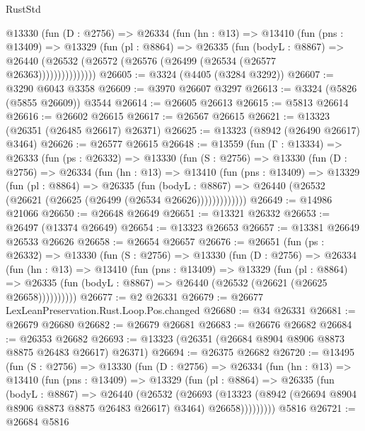 \begin{lexlean}{RustStd}
\begin{coremodule}
          @13330
            (fun (D : @2756) =>
            @26334
              (fun (hn : @13) =>
              @13410
                (fun (pns : @13409) =>
                @13329
                  (fun (pl : @8864) =>
                  @26335
                    (fun (bodyL : @8867) =>
                    @26440 (@26532 (@26572 (@26576 (@26499 (@26534 (@26577 @26363)))))))))))))))
@26605 := @3324 (@4405 (@3284 @3292))
@26607 := @3290 @6043 @3358
@26609 := @3970 @26607 @3297
@26613 := @3324 (@5826 (@5855 @26609)) @3544
@26614 := @26605 @26613
@26615 := @5813 @26614
@26616 := @26602 @26615
@26617 := @26567 @26615
@26621 := @13323 (@26351 (@26485 @26617) @26371)
@26625 := @13323 (@8942 (@26490 @26617) @3464)
@26626 := @26577 @26615
@26648 := @13559
    (fun (Γ : @13334) =>
    @26333
      (fun (ps : @26332) =>
      @13330
        (fun (S : @2756) =>
        @13330
          (fun (D : @2756) =>
          @26334
            (fun (hn : @13) =>
            @13410
              (fun (pns : @13409) =>
              @13329
                (fun (pl : @8864) =>
                @26335
                  (fun (bodyL : @8867) =>
                  @26440 (@26532 (@26621 (@26625 (@26499 (@26534 @26626)))))))))))))
@26649 := @14986 @21066
@26650 := @26648 @26649
@26651 := @13321 @26332
@26653 := @26497 (@13374 @26649)
@26654 := @13323 @26653
@26657 := @13381 @26649 @26533 @26626
@26658 := @26654 @26657
@26676 := @26651
    (fun (ps : @26332) =>
    @13330
      (fun (S : @2756) =>
      @13330
        (fun (D : @2756) =>
        @26334
          (fun (hn : @13) =>
          @13410
            (fun (pns : @13409) =>
            @13329
              (fun (pl : @8864) =>
              @26335 (fun (bodyL : @8867) => @26440 (@26532 (@26621 (@26625 @26658))))))))))
@26677 := @2 @26331
@26679 := @26677 LexLeanPreservation.Rust.Loop.Pos.changed
@26680 := @34 @26331
@26681 := @26679 @26680
@26682 := @26679 @26681
@26683 := @26676 @26682
@26684 := @26353 @26682
@26693 := @13323 (@26351 (@26684 @8904 @8906 @8873 @8875 @26483 @26617) @26371)
@26694 := @26375 @26682
@26720 := @13495
    (fun (S : @2756) =>
    @13330
      (fun (D : @2756) =>
      @26334
        (fun (hn : @13) =>
        @13410
          (fun (pns : @13409) =>
          @13329
            (fun (pl : @8864) =>
            @26335
              (fun (bodyL : @8867) =>
              @26440
                (@26532
                  (@26693
                    (@13323
                      (@8942 (@26694 @8904 @8906 @8873 @8875 @26483 @26617) @3464)
                      @26658)))))))))
    @5816
@26721 := @26684 @5816

\end{coremodule}
\end{lexlean}
